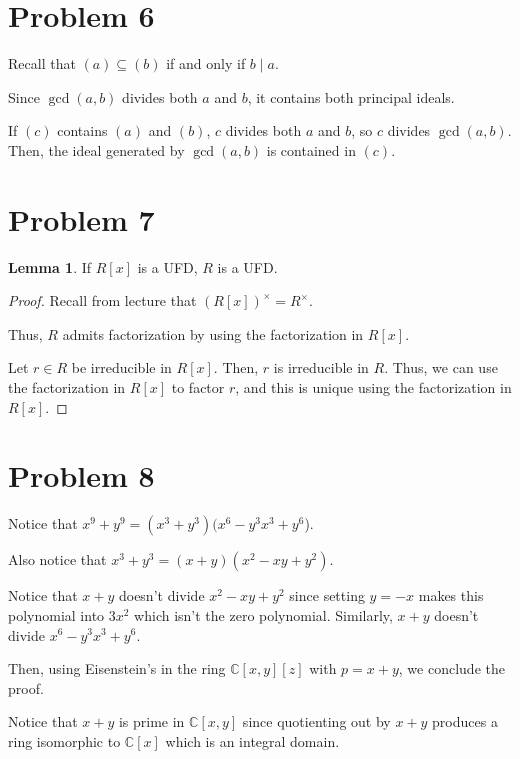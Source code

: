 \documentclass{article}
\theoremstyle{definition}
\newtheorem{lemma}[theorem]{Lemma}
\begin{document}
\newpage

\section{Problem 6}

Recall that $ (a) \subseteq (b) $ if and only if $ b \mid a $.

Since $ \gcd(a,b) $ divides both $ a $ and $ b $, it contains both principal ideals.

If $ (c) $ contains $ (a) $ and $ (b) $, $ c $ divides both $ a $ and $ b $, so $ c $
divides $ \gcd(a,b) $. Then, the ideal generated by $ \gcd(a,b) $ is contained in $ (c) $.

\newpage

\section{Problem 7}

\begin{lemma}
    If $ R[x] $ is a UFD, $ R $ is a UFD.
\end{lemma}
\begin{proof}
    Recall from lecture that $ (R[x])^{\times} = R^{\times} $.
    
    Thus, $ R $ admits factorization by using the factorization in $ R[x] $.

    Let $ r \in R $ be irreducible in $ R[x] $. Then, $ r $ is irreducible in $ R $.
    Thus, we can use the factorization in $ R[x] $ to factor $ r $, and this is unique
    using the factorization in $ R[x] $.
\end{proof}

\section{Problem 8}

Notice that $ x^{9} + y^{9} = (x^{3} + y^{3})(x^{6} - y^{3}x^{3} + y^{6} $).

Also notice that $ x^{3} + y^{3} = (x + y)(x^{2} - xy + y^{2}) $.

Notice that $ x + y $ doesn't divide $ x^{2} - xy + y^{2} $ since setting $ y = -x $
makes this polynomial into $ 3x^{2} $ which isn't the zero polynomial. Similarly,
$ x + y $ doesn't divide $ x^{6} - y^{3}x^{3} + y^{6} $.

Then, using Eisenstein's in the ring $ \mathbb{C}[x,y][z] $ with $ p = x + y $, we conclude the proof.

Notice that $ x + y $ is prime in $ \mathbb{C}[x,y] $ since quotienting out by $ x + y $ produces a ring
isomorphic to $ \mathbb{C}[x] $ which is an integral domain.
\end{document}
